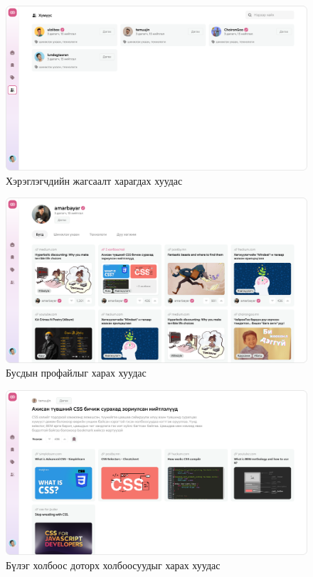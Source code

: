 \begin{figure}[h]
	\centering
	\includegraphics[width=15cm]{images/interfaces/people.png}
	\caption{Хэрэглэгчдийн жагсаалт харагдах хуудас}
	\label{fig:people}
\end{figure}

\begin{figure}[h]
	\centering
	\includegraphics[width=15cm]{images/interfaces/profile.png}
	\caption{Бусдын профайлыг харах хуудас}
	\label{fig:profile}
\end{figure}

\begin{figure}[h]
	\centering
	\includegraphics[width=15cm]{images/interfaces/grouped-link.png}
	\caption{Бүлэг холбоос доторх холбоосуудыг харах хуудас}
	\label{fig:grouped}
\end{figure}






